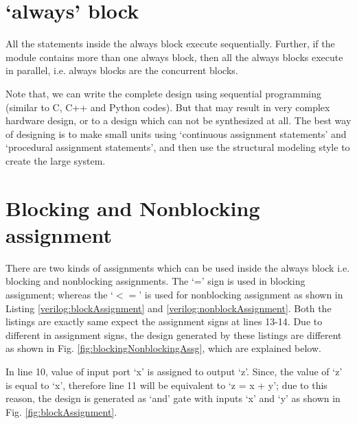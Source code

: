 \section{`always' block}
All the statements inside the always block execute sequentially. Further, if the module contains more than one always block, then all the always blocks execute in parallel, i.e. always blocks are the concurrent blocks. 

\begin{noNumBox}
	Note that, we can write the complete design using sequential programming (similar to C, C++ and Python codes). But that may result in very complex hardware design, or to a design which can not be synthesized at all. The best way of designing is to make small units using `continuous assignment statements' and `procedural assignment statements', and then use the structural modeling style to create the large system. 
\end{noNumBox}

\section{Blocking and Nonblocking assignment}

There are two kinds of assignments which can be used inside the always block i.e. blocking and nonblocking assignments. The `=' sign is used in blocking assignment; whereas the `$<=$' is used for nonblocking assignment as shown in Listing \ref{verilog:blockAssignment} and \ref{verilog:nonblockAssignment}. Both the listings are exactly same expect the assignment signs at lines 13-14. Due to different in assignment signs, the design generated by these listings are different as shown in Fig. \ref{fig:blockingNonblockingAssg}, which are explained below.

\begin{explanation}
	In line 10, value of input port `x' is assigned to output `z'. Since, the value of `z' is equal to `x', therefore line 11 will be equivalent to `z = x + y'; due to this reason, the design is generated as `and' gate with inputs `x' and `y' as shown in Fig. \ref{fig:blockAssignment}.
\end{explanation}




